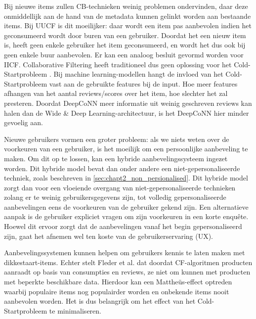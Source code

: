 Bij nieuwe items zullen CB-technieken weinig problemen ondervinden, daar deze onmiddellijk aan de hand van de metadata kunnen gelinkt worden aan bestaande items. Bij UUCF is dit moeilijker: daar wordt een item pas aanbevolen indien het geconsumeerd wordt door buren van een gebruiker. Doordat het een nieuw item is, heeft geen enkele gebruiker het item geconsumeerd, en wordt het dus ook bij geen enkele buur aanbevolen. Er kan een analoog besluit gevormd worden voor IICF. Collaborative Filtering heeft traditioneel dus geen oplossing voor het Cold-Startprobleem \cite{recsys_diversity}.  Bij machine learning-modellen hangt de invloed van het Cold-Startprobleem vast aan de gebruikte features bij de input. Hoe meer features afhangen van het aantal reviews/scores over het item, hoe slechter het zal presteren. Doordat DeepCoNN meer informatie uit weinig geschreven reviews kan halen dan de Wide \& Deep Learning-architectuur, is het DeepCoNN hier minder gevoelig aan. \cite{deepconn}

Nieuwe gebruikers vormen een groter probleem: als we niets weten over de voorkeuren van een gebruiker, is het moeilijk om een persoonlijke aanbeveling te maken. Om dit op te lossen, kan een hybride aanbevelingssysteem ingezet worden. Dit hybride model bevat dan onder andere een niet-gepersonaliseerde techniek, zoals beschreven in \autoref{sec:chapt2_non_persionalised}. Dit hybride model zorgt dan voor een vloeiende overgang van niet-gepersonaliseerde technieken zolang er te weinig gebruikersgegevens zijn, tot volledig gepersonaliseerde aanbevelingen eens de voorkeuren van de gebruiker gekend zijn. Een alternatieve aanpak is de gebruiker expliciet vragen om zijn voorkeuren in een korte enquête. Hoewel dit ervoor zorgt dat de aanbevelingen vanaf het begin gepersonaliseerd zijn, gaat het afnemen wel ten koste van de gebruikerservaring (UX).

Aanbevelingssystemen kunnen helpen om gebruikers kennis te laten maken met dikkestaart-items. Echter stelt Fleder et al. \cite{recsys_diversity} dat doordat CF-algoritmen producten aanraadt op basis van consumpties en reviews, ze niet om kunnen met producten met beperkte beschikbare data. Hierdoor kan een Mattheüs-effect optreden waarbij populaire items nog populairder worden en onbekende items nooit aanbevolen worden. Het is dus belangrijk om het effect van het Cold-Startprobleem te minimaliseren.


